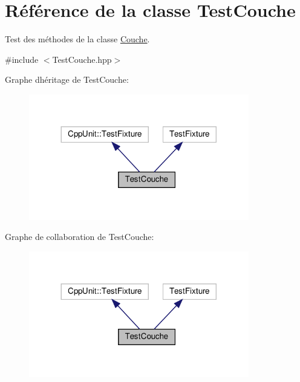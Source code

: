 \hypertarget{class_test_couche}{}\section{Référence de la classe Test\+Couche}
\label{class_test_couche}


Test des méthodes de la classe \hyperlink{class_couche}{Couche}.  




{\ttfamily \#include $<$Test\+Couche.\+hpp$>$}



Graphe d\textquotesingle{}héritage de Test\+Couche\+:\nopagebreak
\begin{figure}[H]
\begin{center}
\leavevmode
\includegraphics[width=272pt]{class_test_couche__inherit__graph}
\end{center}
\end{figure}


Graphe de collaboration de Test\+Couche\+:\nopagebreak
\begin{figure}[H]
\begin{center}
\leavevmode
\includegraphics[width=272pt]{class_test_couche__coll__graph}
\end{center}
\end{figure}
